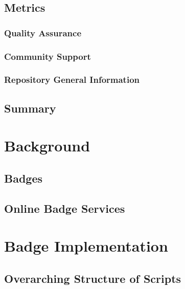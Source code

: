 \documentclass[12pt, letterpaper]{article}
\begin{document}
\subsection{Metrics}
\subsubsection{Quality Assurance}

\subsubsection{Community Support}

\subsubsection{Repository General Information}

\subsection{Summary}

\section{Background}

\subsection{Badges}
\subsection{Online Badge Services}

\section{Badge Implementation}
\subsection{Overarching Structure of Scripts}
\end{document}
